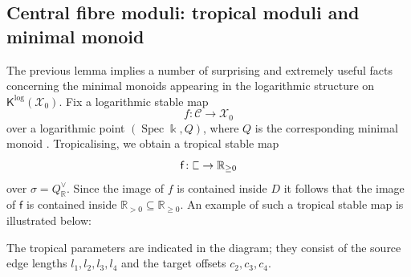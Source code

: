\documentclass[11pt]{amsart}
\theoremstyle{definition}
\theoremstyle{definition}
\newcommand{\RR}{\mathbb{R}}
\newcommand{\sqC}{\scalebox{0.8}[1.2]{$\sqsubset$}}
\newcommand{\Speck}{\operatorname{Spec}\kfield}
\newcommand{\kfield}{\Bbbk}
\newcommand{\Xcal}{\mathcal{X}}
\newcommand{\Ccal}{\mathcal{C}}
\newcommand{\Kup}{\mathsf{K}}
\begin{document}
\subsection{Central fibre moduli: tropical moduli and minimal monoid} \label{sec: tropical moduli and minimal monoid} The previous lemma implies a number of surprising and extremely useful facts concerning the minimal monoids appearing in the logarithmic structure on $\Kup^{\log}(\Xcal_0)$. Fix a logarithmic stable map
\begin{equation*} f \colon \Ccal \to \Xcal_0 \end{equation*}
over a logarithmic point $(\Speck, Q)$, where $Q$ is the corresponding minimal monoid \cite{GrossSiebertLog}. Tropicalising, we obtain a tropical stable map
\begin{equation}\label{tropical map} \mathsf{f} \colon \sqC \to \mathbb{R} _{\geq 0}\end{equation}
over $\sigma = Q^\vee_{\RR}$. Since the image of $f$ is contained inside $D$ it follows that the image of $\mathsf{f}$ is contained inside $\RR_{>0} \subseteq \RR_{\geq 0}$. An example of such a tropical stable map is illustrated below:
\begin{center}
\end{center}
The tropical parameters are indicated in the diagram; they consist of the source edge lengths $l_1,l_2,l_3,l_4$ and the target offsets $c_2,c_3,c_4$.
\end{document}
